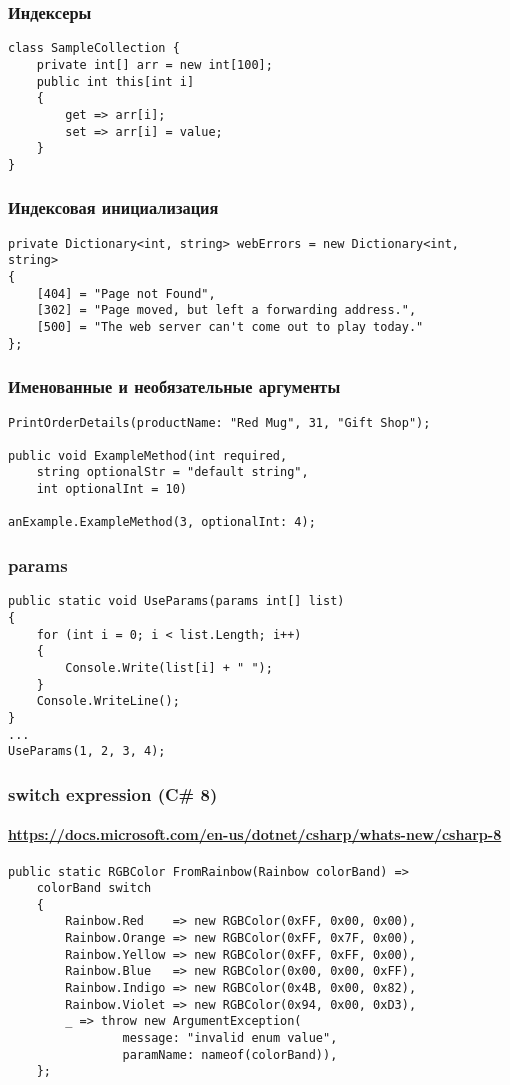 \documentclass[xetex,mathserif,serif]{beamer}
\begin{document}
    \begin{frame}[fragile]
        \frametitle{Индексеры}
        \begin{verbatim}
class SampleCollection {
    private int[] arr = new int[100];
    public int this[int i]
    {
        get => arr[i];
        set => arr[i] = value;
    }
}
        \end{verbatim}
    \end{frame}

    \begin{frame}[fragile]
        \frametitle{Индексовая инициализация}
        \begin{verbatim}
private Dictionary<int, string> webErrors = new Dictionary<int, string>
{
    [404] = "Page not Found",
    [302] = "Page moved, but left a forwarding address.",
    [500] = "The web server can't come out to play today."
};
        \end{verbatim}
    \end{frame}

    \begin{frame}[fragile]
        \frametitle{Именованные и необязательные аргументы}
        \begin{verbatim}
PrintOrderDetails(productName: "Red Mug", 31, "Gift Shop");

public void ExampleMethod(int required, 
    string optionalStr = "default string",
    int optionalInt = 10)

anExample.ExampleMethod(3, optionalInt: 4);
        \end{verbatim}
    \end{frame}

    \begin{frame}[fragile]
        \frametitle{params}
        \begin{verbatim}
public static void UseParams(params int[] list)
{
    for (int i = 0; i < list.Length; i++)
    {
        Console.Write(list[i] + " ");
    }
    Console.WriteLine();
}
...
UseParams(1, 2, 3, 4);
        \end{verbatim}
    \end{frame}

    \begin{frame}[fragile]
        \frametitle{switch expression (C\# 8)}
        \framesubtitle{\url{https://docs.microsoft.com/en-us/dotnet/csharp/whats-new/csharp-8}}
        \begin{verbatim}
public static RGBColor FromRainbow(Rainbow colorBand) =>
    colorBand switch
    {
        Rainbow.Red    => new RGBColor(0xFF, 0x00, 0x00),
        Rainbow.Orange => new RGBColor(0xFF, 0x7F, 0x00),
        Rainbow.Yellow => new RGBColor(0xFF, 0xFF, 0x00),
        Rainbow.Blue   => new RGBColor(0x00, 0x00, 0xFF),
        Rainbow.Indigo => new RGBColor(0x4B, 0x00, 0x82),
        Rainbow.Violet => new RGBColor(0x94, 0x00, 0xD3),
        _ => throw new ArgumentException(
                message: "invalid enum value", 
                paramName: nameof(colorBand)),
    };
        \end{verbatim}
    \end{frame}
\end{document}
